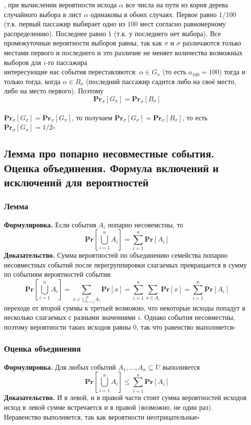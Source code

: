 \documentclass[a4paper]{article}
\newcommand{\qed}{\hfill$\square$}
\begin{document}
, при вычислении вероятности исхода $\alpha$ все числа на пути из корня дерева случайного выбора в лист $\alpha$ одинаковы в обоих случаях. Первое равно 1/100 (т.к. первый пассажир выбирает одно из 100 мест согласно равномерному распределению). Последнее равно 1 (т.к. у последнего нет выбора). Все промежуточные вероятности выборов равны, так как $\pi$ и $\sigma$ различаются только местами первого и последнего и это различие не меняет количества возможных выборов для $i$-го пассажира\\[2mm]
 интересующие нас события переставляются: $\alpha \in G_\pi$ (то есть $a_{100}=100$) тогда и только тогда, когда $\alpha \in B_\sigma$ (последний пассажир садится либо на своё место, либо на место первого). Поэтому
$$
\mathbf{P r}_\pi\left[G_\pi\right]=\mathbf{P r}_\sigma\left[B_\sigma\right]
$$\\[2mm]
 $\mathbf{Pr}_\sigma\left[G_\sigma\right]=\mathbf{P r}_\pi\left[G_\pi\right]$, то получаем $\mathbf{P r}_\sigma\left[G_\sigma\right]=\mathbf{P r}_\sigma\left[B_\sigma\right]$, то есть $\mathbf{P r}_\sigma\left[G_\sigma\right]=1 / 2$\qed


\subsection{Лемма про попарно несовместные события. Оценка объединения. Формула включений и исключений для вероятностей}
\subsubsection*{Лемма}
\textbf{Формулировка.} Если события $A_i$ попарно несовемстны, то $$\textbf{Pr}\left[\bigcup_{i=1}^n A_i\right]=\sum_{i=1}^n \textbf{Pr}[A_i]$$
\indent\textbf{Доказательство.} Сумма вероятностей по объединению семейства попарно несовместных событий после перегруппировки слагаемых превращается в сумму по событиям вероятностей события:
$$
\textbf{Pr}\left[\bigcup_{i=1}^n A_i\right]=\sum_{x \in \bigcup_{i=1}^n A_i} \textbf{Pr}[x]=\sum_{i=1}^n \sum_{x \in A_i} \textbf{Pr}[x]=\sum_{i=1}^n \textbf{Pr}\left[A_i\right]
$$
 переходе от второй суммы к третьей возможно, что некоторые исходы попадут в несколько слагаемых с разными значениями $i$. Однако события несовместны, поэтому вероятности таких исходов равны 0, так что равенство выполняется\qed

\subsubsection*{Оценка объединения}
\textbf{Формулировка.} Для любых событий $A_1,\ldots, A_n\subseteq U$ выполняется $$\textbf{Pr}\left[\bigcup_{i=1}^n A_i\right]\leqslant\sum_{i=1}^n \textbf{Pr}[A_i]$$
\indent\textbf{Доказательство.} И в левой, и в правой части стоит сумма вероятностей исходов\\
 исход в левой сумме встречается и в правой (возможно, не один раз). Неравенство выполняется, так как вероятности неотрицательные\qed
\end{document}
